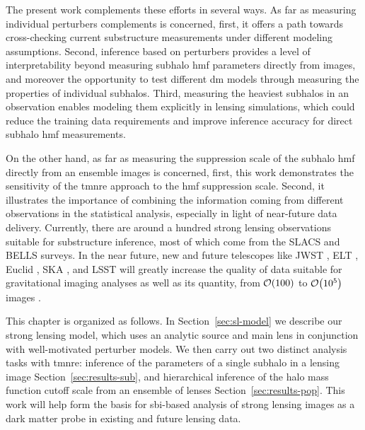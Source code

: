 The present work complements these efforts in several ways. As far as measuring individual perturbers complements is concerned, first, it offers a path towards cross-checking current substructure measurements under different modeling assumptions. Second, inference based on perturbers provides a level of interpretability beyond measuring subhalo \gls*{hmf} parameters directly from images, and moreover the opportunity to test different \gls*{dm} models through measuring the properties of individual subhalos. Third, measuring the heaviest subhalos in an observation enables modeling them explicitly in lensing simulations, which could reduce the training data requirements and improve inference accuracy for direct subhalo \gls*{hmf} measurements.

 On the other hand, as far as measuring the suppression scale of the subhalo \gls*{hmf} directly from an ensemble images is concerned, first, this work demonstrates the sensitivity of the \gls*{tmnre} approach to the \gls*{hmf} suppression scale. Second, it illustrates the importance of combining the information coming from different observations in the statistical analysis, especially in light of near-future data delivery. Currently, there are around a hundred strong lensing observations suitable for substructure inference, most of which come from the SLACS \citep{Bolton:2005nf} and BELLS \citep{BOSS:2011bef} surveys. In the near future, new and future telescopes like JWST \citep{Gardner:2006ky}, ELT \citep{Simon:2019aa}, Euclid \citep{Refregier:2010ss, EUCLID:2011zbd}, SKA \citep{Koopmans:2004gf}, and LSST \citep{LSSTDarkEnergyScience:2020oya} will greatly increase the quality of data suitable for gravitational imaging analyses as well as its quantity, from $\order{100}$ to $\order{10^5}$ images \citep{Collett:2015roa, McKean:2015aa}.

This chapter is organized as follows. In Section~\ref{sec:sl-model} we describe our strong lensing model, which uses an analytic source and main lens in conjunction with well-motivated perturber models. We then carry out two distinct analysis tasks with \gls*{tmnre}: inference of the parameters of a single subhalo in a lensing image Section~\ref{sec:results-sub}, and hierarchical inference of the halo mass function cutoff scale from an ensemble of lenses Section~\ref{sec:results-pop}. This work will help form the basis for \gls*{sbi}-based analysis of strong lensing images as a dark matter probe in existing and future lensing data.




